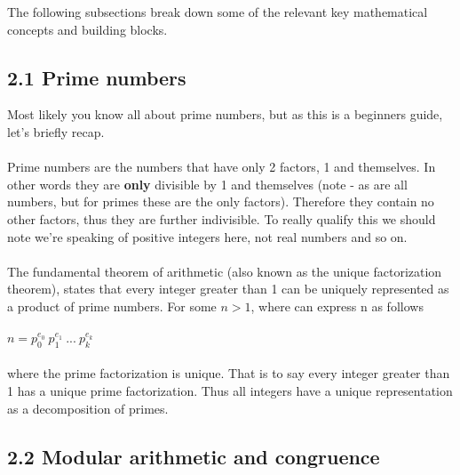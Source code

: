 \documentclass[11pt]{article}   	%
\begin{document}
The following subsections break down some of the relevant key mathematical concepts and building blocks.

\subsection*{2.1 Prime numbers}

Most likely you know all about prime numbers, but as this is a beginners guide, let's briefly recap. \\
\\
Prime numbers are the numbers that have only 2 factors, 1 and themselves. In other words they are \textbf{only} divisible by 1 and themselves (note - as are all numbers, but for primes these are the only factors). Therefore they contain no other factors, thus they are further indivisible. To really qualify this we should note we're speaking of positive integers here, not real numbers and so on. \\
\\
The fundamental theorem of arithmetic (also known as the unique factorization theorem), states that every integer greater than 1 can be uniquely represented as a product of prime numbers. For some $ n > 1 $, where can express n as follows \\
\\
$ n = p_0^{e_0} \ p_1^{e_1} \ ... \ p_k^{e_k} $ \\
\\
where the prime factorization is unique. That is to say every integer greater than 1 has a unique prime factorization. Thus all integers have a unique representation as a decomposition of primes.


\subsection*{2.2 Modular arithmetic and congruence}
\end{document}
